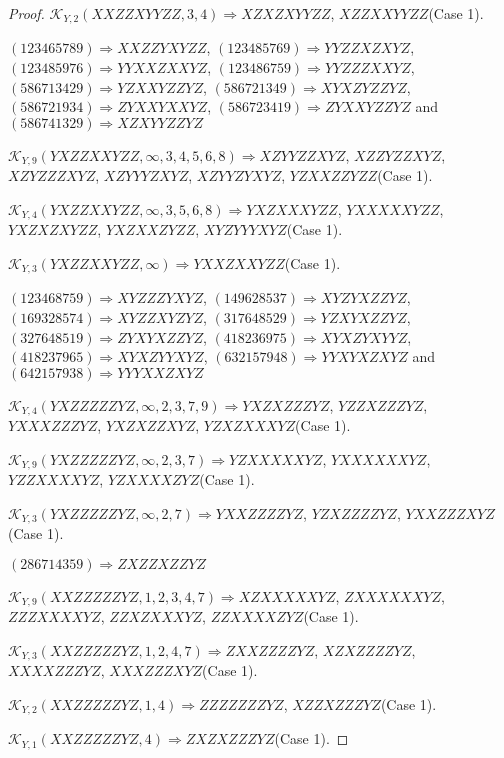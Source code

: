 \documentclass[12pt]{article}
\theoremstyle{plain}
\theoremstyle{definition}
\theoremstyle{remark}
\newcommand{\fancy}[1]{\mathcal{#1}}
\def\K{\fancy{K}}
\begin{document}
\begin{proof}
	$\K_{Y,2}(XXZZXYYZZ,3, 4)\Rightarrow $$XZXZXYYZZ$, $XZZXXYYZZ$(Case 1).
	
	
	
	$(1 2 3 4 6 5 7 8 9)\Rightarrow XXZZYXYZZ$, $(1 2 3 4 8 5 7 6 9)\Rightarrow YYZZXZXYZ$, $(1 2 3 4 8 5 9 7 6)\Rightarrow YYXXZXXYZ$, $(1 2 3 4 8 6 7 5 9)\Rightarrow YYZZZXXYZ$, $(5 8 6 7 1 3 4 2 9)\Rightarrow YZXXYZZYZ$, $(5 8 6 7 2 1 3 4 9)\Rightarrow XYXZYZZYZ$, $(5 8 6 7 2 1 9 3 4)\Rightarrow ZYXXYXXYZ$, $(5 8 6 7 2 3 4 1 9)\Rightarrow ZYXXYZZYZ$ and $(5 8 6 7 4 1 3 2 9)\Rightarrow XZXYYZZYZ$
	
	
	$\K_{Y,9}(YXZZXXYZZ,\infty,3, 4, 5, 6, 8)\Rightarrow $$XZYYZZXYZ$, $XZZYZZXYZ$, $XZYZZZXYZ$, $XZYYYZXYZ$, $XZYYZYXYZ$, $YZXXZZYZZ$(Case 1).
	
	$\K_{Y,4}(YXZZXXYZZ,\infty,3, 5, 6, 8)\Rightarrow $$YXZXXXYZZ$, $YXXXXXYZZ$, $YXZXZXYZZ$, $YXZXXZYZZ$, $XYZYYYXYZ$(Case 1).
	
	$\K_{Y,3}(YXZZXXYZZ,\infty)\Rightarrow $$YXXZXXYZZ$(Case 1).
	
	
	
	$(1 2 3 4 6 8 7 5 9)\Rightarrow XYZZZYXYZ$, $(1 4 9 6 2 8 5 3 7)\Rightarrow XYZYXZZYZ$, $(1 6 9 3 2 8 5 7 4)\Rightarrow XYZZXYZYZ$, $(3 1 7 6 4 8 5 2 9)\Rightarrow YZXYXZZYZ$, $(3 2 7 6 4 8 5 1 9)\Rightarrow ZYXYXZZYZ$, $(4 1 8 2 3 6 9 7 5)\Rightarrow XYXZYXYYZ$, $(4 1 8 2 3 7 9 6 5)\Rightarrow XYXZYYXYZ$, $(6 3 2 1 5 7 9 4 8)\Rightarrow YYXYXZXYZ$ and $(6 4 2 1 5 7 9 3 8)\Rightarrow YYYXXZXYZ$
	
	
	$\K_{Y,4}(YXZZZZZYZ,\infty,2, 3, 7, 9)\Rightarrow $$YXZXZZZYZ$, $YZZXZZZYZ$, $YXXXZZZYZ$, $YXZXZZXYZ$, $YZXZXXXYZ$(Case 1).
	
	$\K_{Y,9}(YXZZZZZYZ,\infty,2, 3, 7)\Rightarrow $$YZXXXXXYZ$, $YXXXXXXYZ$, $YZZXXXXYZ$, $YZXXXXZYZ$(Case 1).
	
	$\K_{Y,3}(YXZZZZZYZ,\infty,2, 7)\Rightarrow $$YXXZZZZYZ$, $YZXZZZZYZ$, $YXXZZZXYZ$(Case 1).
	
	
	
	$(2 8 6 7 1 4 3 5 9)\Rightarrow ZXZZXZZYZ$
	
	
	$\K_{Y,9}(XXZZZZZYZ,1, 2, 3, 4, 7)\Rightarrow $$XZXXXXXYZ$, $ZXXXXXXYZ$, $ZZZXXXXYZ$, $ZZXZXXXYZ$, $ZZXXXXZYZ$(Case 1).
	
	$\K_{Y,3}(XXZZZZZYZ,1, 2, 4, 7)\Rightarrow $$ZXXZZZZYZ$, $XZXZZZZYZ$, $XXXXZZZYZ$, $XXXZZZXYZ$(Case 1).
	
	$\K_{Y,2}(XXZZZZZYZ,1, 4)\Rightarrow $$ZZZZZZZYZ$, $XZZXZZZYZ$(Case 1).
	
	$\K_{Y,1}(XXZZZZZYZ,4)\Rightarrow $$ZXZXZZZYZ$(Case 1).
	

\end{proof}
\end{document}
